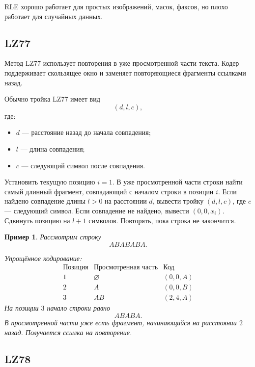 \documentclass[12pt,a4paper]{article}
\newtheorem{example}{Пример}[section]
\begin{document}
RLE хорошо работает для простых изображений, масок, факсов, но плохо работает для случайных данных.

\subsection{LZ77}

Метод LZ77 использует повторения в уже просмотренной части текста.
Кодер поддерживает скользящее окно и заменяет повторяющиеся фрагменты ссылками назад.

Обычно тройка LZ77 имеет вид
\[
    (d,l,c),
\]
где:
\begin{itemize}
    \item $d$ --- расстояние назад до начала совпадения;
    \item $l$ --- длина совпадения;
    \item $c$ --- следующий символ после совпадения.
\end{itemize}

\begin{algorithm}[H]
\caption{Упрощённое LZ77-кодирование}
\begin{algorithmic}[1]
\STATE Установить текущую позицию $i=1$.
\STATE В уже просмотренной части строки найти самый длинный фрагмент, совпадающий с началом строки в позиции $i$.
\STATE Если найдено совпадение длины $l>0$ на расстоянии $d$, вывести тройку $(d,l,c)$, где $c$ --- следующий символ.
\STATE Если совпадение не найдено, вывести $(0,0,x_i)$.
\STATE Сдвинуть позицию на $l+1$ символов.
\STATE Повторять, пока строка не закончится.
\end{algorithmic}
\end{algorithm}

\begin{example}
Рассмотрим строку
\[
    ABABABA.
\]

Упрощённое кодирование:
\[
\begin{array}{c|c|c}
\text{Позиция} & \text{Просмотренная часть} & \text{Код}\\
\hline
1 & \varnothing & (0,0,A)\\
2 & A & (0,0,B)\\
3 & AB & (2,4,A)
\end{array}
\]
На позиции $3$ начало строки равно
\[
    ABABA.
\]
В просмотренной части уже есть фрагмент, начинающийся на расстоянии $2$ назад.
Получается ссылка на повторение.
\end{example}

\subsection{LZ78}
\end{document}
